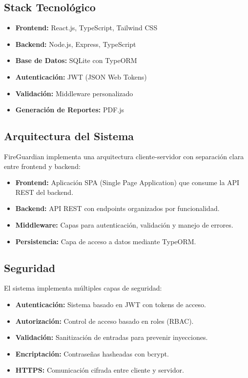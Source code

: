 \documentclass[11pt,a4paper]{article}
\begin{document}
\subsection{Stack Tecnológico}

\begin{itemize}
    \item \textbf{Frontend:} React.js, TypeScript, Tailwind CSS
    \item \textbf{Backend:} Node.js, Express, TypeScript
    \item \textbf{Base de Datos:} SQLite con TypeORM
    \item \textbf{Autenticación:} JWT (JSON Web Tokens)
    \item \textbf{Validación:} Middleware personalizado
    \item \textbf{Generación de Reportes:} PDF.js
\end{itemize}

\subsection{Arquitectura del Sistema}

FireGuardian implementa una arquitectura cliente-servidor con separación clara entre frontend y backend:

\begin{itemize}
    \item \textbf{Frontend:} Aplicación SPA (Single Page Application) que consume la API REST del backend.
    \item \textbf{Backend:} API REST con endpoints organizados por funcionalidad.
    \item \textbf{Middleware:} Capas para autenticación, validación y manejo de errores.
    \item \textbf{Persistencia:} Capa de acceso a datos mediante TypeORM.
\end{itemize}

\subsection{Seguridad}

El sistema implementa múltiples capas de seguridad:

\begin{itemize}
    \item \textbf{Autenticación:} Sistema basado en JWT con tokens de acceso.
    \item \textbf{Autorización:} Control de acceso basado en roles (RBAC).
    \item \textbf{Validación:} Sanitización de entradas para prevenir inyecciones.
    \item \textbf{Encriptación:} Contraseñas hasheadas con bcrypt.
    \item \textbf{HTTPS:} Comunicación cifrada entre cliente y servidor.
\end{itemize}
\end{document}
